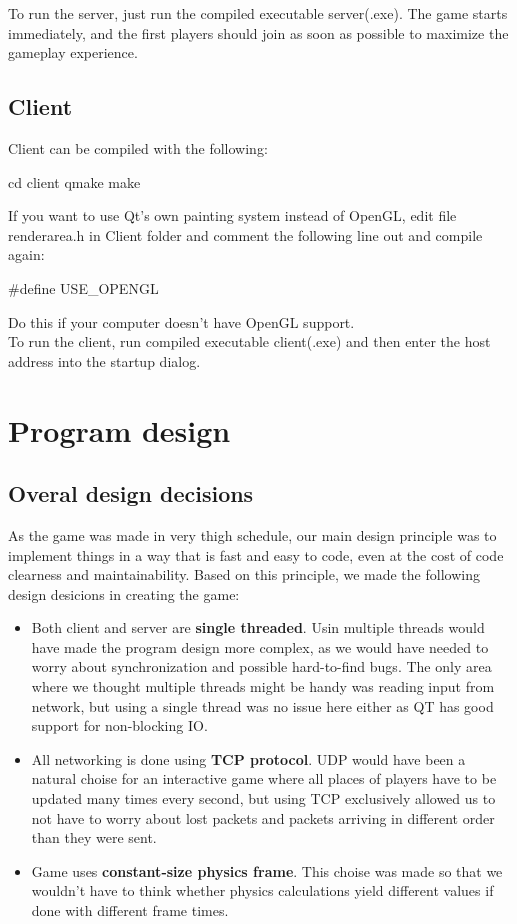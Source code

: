 \documentclass[a4paper,12pt,titlepage]{article}
\begin{document}
To run the server, just run the compiled executable server(.exe). The game starts immediately, and the first players should join as soon as possible to maximize the gameplay experience.

\subsection{Client}

Client can be compiled with the following:
    \begin{verbatimtab}[3]
        cd client
        qmake
        make
    \end{verbatimtab}
If you want to use Qt's own painting system instead of OpenGL, edit file renderarea.h in Client folder and comment the following line out and compile again: 
    \begin{verbatimtab}[3]
        #define USE_OPENGL
    \end{verbatimtab}
Do this if your computer doesn't have OpenGL support.\\
To run the client, run compiled executable client(.exe) and then enter the host address into the startup dialog.

\section{Program design}

\subsection{Overal design decisions}

As the game was made in very thigh schedule, our main design principle was to implement things in a way that is fast and easy to code, even at the cost of code clearness and maintainability. Based on this principle, we made the following design desicions in creating the game:
\begin{itemize}
\item Both client and server are \textbf{single threaded}. Usin multiple threads would have made the program design more complex, as we would have needed to worry about synchronization and possible hard-to-find bugs. The only area where we thought multiple threads might be handy was reading input from network, but using a single thread was no issue here either as QT has good support for non-blocking IO.
\item All networking is done using \textbf{TCP protocol}. UDP would have been a natural choise for an interactive game where all places of players have to be updated many times every second, but using TCP exclusively allowed us to not have to worry about lost packets and packets arriving in different order than they were sent.
\item Game uses \textbf{constant-size physics frame}. This choise was made so that we wouldn't have to think whether physics calculations yield different values if done with different frame times.
\end{itemize}
\end{document}
